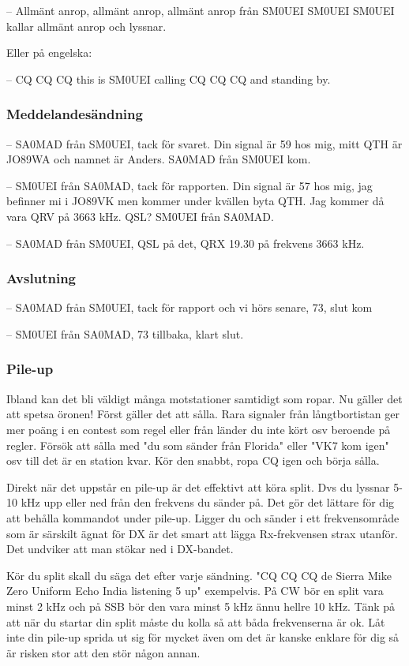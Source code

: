 -- Allmänt anrop, allmänt anrop, allmänt anrop från SM0UEI SM0UEI SM0UEI kallar allmänt anrop och lyssnar.

Eller på engelska:

-- CQ CQ CQ this is SM0UEI calling CQ CQ CQ and standing by.

\subsubsection{Meddelandesändning}

-- SA0MAD från SM0UEI, tack för svaret. Din signal är 59 hos mig, mitt QTH är JO89WA och namnet är Anders. SA0MAD från SM0UEI kom.

-- SM0UEI från SA0MAD, tack för rapporten. Din signal är 57 hos mig, jag befinner mi i JO89VK men kommer under kvällen byta QTH. Jag kommer då vara QRV på 3663 kHz. QSL? SM0UEI från SA0MAD.

-- SA0MAD från SM0UEI, QSL på det, QRX 19.30 på frekvens 3663 kHz. 

\subsubsection{Avslutning}

-- SA0MAD från SM0UEI, tack för rapport och vi hörs senare, 73, slut kom

-- SM0UEI från SA0MAD, 73 tillbaka, klart slut.

\subsubsection{Pile-up}

Ibland kan det bli väldigt många motstationer samtidigt som ropar. Nu gäller det att spetsa öronen! Först gäller det att sålla. Rara signaler från långtbortistan ger mer poäng i en contest som regel eller från länder du inte kört osv beroende på regler. Försök att sålla med "du som sänder från Florida" eller "VK7 kom igen" osv till det är en station kvar. Kör den snabbt, ropa CQ igen och börja sålla.

Direkt när det uppstår en pile-up är det effektivt att köra split. Dvs du lyssnar 5-10 kHz upp eller ned från den frekvens du sänder på. Det gör det lättare för dig att behålla kommandot under pile-up. Ligger du och sänder i ett frekvensområde som är särskilt ägnat för DX är det smart att lägga Rx-frekvensen strax utanför. Det undviker att man stökar ned i DX-bandet.

Kör du split skall du säga det efter varje sändning. "CQ CQ CQ de Sierra Mike Zero Uniform Echo India listening 5 up" exempelvis. På CW bör en split vara minst 2 kHz och på SSB bör den vara minst 5 kHz ännu hellre 10 kHz. Tänk på att när du startar din split måste du kolla så att båda frekvenserna är ok. Låt inte din pile-up sprida ut sig för mycket även om det är kanske enklare för dig så är risken stor att den stör någon annan. 

